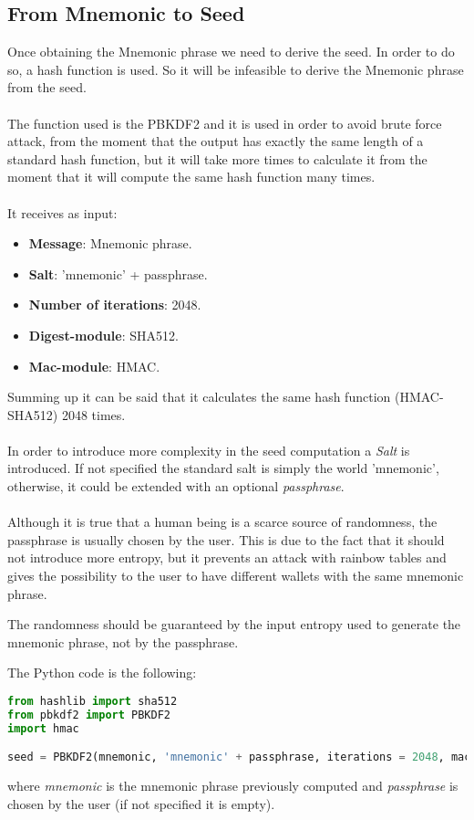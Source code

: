 \subsection{From Mnemonic to Seed}
Once obtaining the Mnemonic phrase we need to derive the seed. In order to do so, a hash function is used. So it will be infeasible to derive the Mnemonic phrase from the seed.
\\ \\
The function used is the PBKDF2 and it is used in order to avoid brute force attack, from the moment that the output has exactly the same length of a standard hash function, but it will take more times to calculate it from the moment that it will compute the same hash function many times.
\\ \\
It receives as input:
\begin{itemize}[label=$\odot$]
	\item \textbf{Message}: Mnemonic phrase.
	\item \textbf{Salt}: 'mnemonic' + passphrase.
	\item \textbf{Number of iterations}: 2048.
	\item \textbf{Digest-module}: SHA512.
	\item \textbf{Mac-module}: HMAC.
\end{itemize}
Summing up it can be said that it calculates the same hash function (HMAC-SHA512) 2048 times.
\\ \\
In order to introduce more complexity in the seed computation a \textit{Salt} is introduced. If not specified the standard salt is simply the world 'mnemonic', otherwise, it could be extended with an optional \textit{passphrase}.
\\ \\
Although it is true that a human being is a scarce source of randomness, the passphrase is usually chosen by the user. This is due to the fact that it should not introduce more entropy, but it prevents an attack with rainbow tables and gives the possibility to the user to have different wallets with the same mnemonic phrase.
\begin{remark}
	The randomness should be guaranteed by the input entropy used to generate the mnemonic phrase, not by the passphrase.
\end{remark}
The Python code is the following:
\begin{lstlisting}[language=Python]
from hashlib import sha512
from pbkdf2 import PBKDF2
import hmac

seed = PBKDF2(mnemonic, 'mnemonic' + passphrase, iterations = 2048, macmodule = hmac, digestmodule = sha512).read(64)
\end{lstlisting}
where \textit{mnemonic} is the mnemonic phrase previously computed and \textit{passphrase} is chosen by the user (if not specified it is empty).

